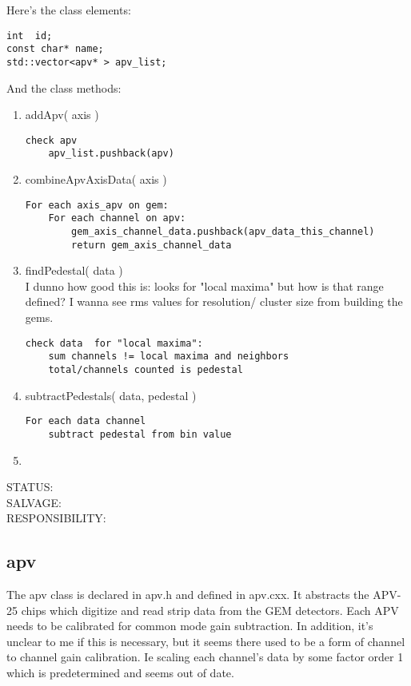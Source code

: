 \documentclass[11pt]{article}
\newcommand{\featureFooter}{
\noindent
STATUS: \\
SALVAGE:\\
RESPONSIBILITY:}
\begin{document}
	Here's the class elements:
	\begin{lstlisting} 
int  id;
const char* name;
std::vector<apv* > apv_list;
	\end{lstlisting} 
	
	And the class methods:
	\begin{enumerate}
		\item addApv( axis )
		\begin{lstlisting}
check apv
	apv_list.pushback(apv)
		\end{lstlisting}
		
		\item combineApvAxisData( axis )
		\begin{lstlisting}
For each axis_apv on gem:
	For each channel on apv:
		gem_axis_channel_data.pushback(apv_data_this_channel)
		return gem_axis_channel_data
		\end{lstlisting}
		
		\item findPedestal( data )\\
I dunno how good this is: looks for "local maxima" but how is that range defined? I wanna see rms values for resolution/ cluster size from building the gems.
		\begin{lstlisting}
check data  for "local maxima":
	sum channels != local maxima and neighbors
	total/channels counted is pedestal		
		\end{lstlisting}
	
		\item subtractPedestals( data, pedestal )
		\begin{lstlisting}
For each data channel
	subtract pedestal from bin value
		\end{lstlisting}
		
		\item 
		\begin{lstlisting}
		\end{lstlisting}
	\end{enumerate}
	
	\featureFooter
	
	\subsection{apv}
	The apv class is declared in apv.h and defined in apv.cxx. It abstracts the APV-25 chips which digitize and read strip data from the GEM detectors. Each APV needs to be calibrated for common mode gain subtraction. In addition, it's unclear to me if this is necessary, but it seems there used to be a form of channel to channel gain calibration. Ie scaling each channel's data by some factor order 1 which is predetermined and seems out of date.\\
	
\end{document}
